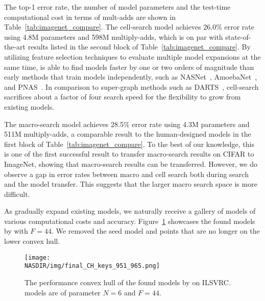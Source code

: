 The top-1 error rate, the number of model parameters and the test-time computational cost in terms of mult-adds are shown in Table~\ref{tab:imagenet_compare}.  The \Petridish cell-search model achieves 26.0\% error rate using 4.8M parameters and 598M multiply-adds, which is on par with state-of-the-art results listed in the second block of Table~\ref{tab:imagenet_compare}. By utilizing feature selection techniques to evaluate multiple model expansions at the same time, \Petridish is able to find models faster by one or two orders of magnitude than early methods that train models independently, such as NASNet~\citep{NASCell}, AmoebaNet~\citep{Real2018RegularizedEF}, and PNAS~\citep{Liu2017ProgressiveNA}.  
In comparison to super-graph methods such as DARTS~\citep{Liu2018DARTSDA}, \Petridish cell-search sacrifices about a factor of four search speed for the flexibility to grow from existing models. 

The \Petridish macro-search model achieves 28.5\% error rate using 4.3M parameters and 511M multiply-adds, a comparable result to the human-designed models in the first block of Table~\ref{tab:imagenet_compare}. To the best of our knowledge, this is one of the first successful result to transfer macro-search results on CIFAR to ImageNet, showing that macro-search results can be transferred. 
However, we do observe a gap in error rates between \Petridish macro and cell search both during search and the model transfer. This suggests that the larger macro search space is more difficult. 

As \Petridish gradually expand existing models, we naturally receive a gallery of models of various computational costs and accuracy. Figure~\ref{fig:imagenet_convexhull} showcases the found models by \Petridish with $F=44$. We removed the seed model and points that are no longer on the lower convex hull. 

\begin{figure}
    \centering
    \texttt{[image: \\NASDIR/img/final\_CH\_keys\_951\_965.png]}
    \caption{The performance convex hull of the found models by \Petridish on ILSVRC. \Petridish models are of parameter $N=6$ and $F=44$.}
    \label{fig:imagenet_convexhull}
\end{figure}

